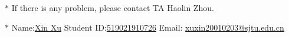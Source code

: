 \documentclass[12pt,a4paper]{article}
\theoremstyle{definition}
\begin{document}
	\noindent
	
	\noindent{}
	\begin{center}
		\footnotesize{\color{red}$*$ If there is any problem, please contact TA Haolin Zhou.}
		
		\footnotesize{\color{blue}$*$ Name:\underline{Xin Xu}  \quad Student ID:\underline{519021910726} \quad Email: \underline{xuxin20010203@sjtu.edu.cn}}
		
	\end{center}
	
\end{document}
